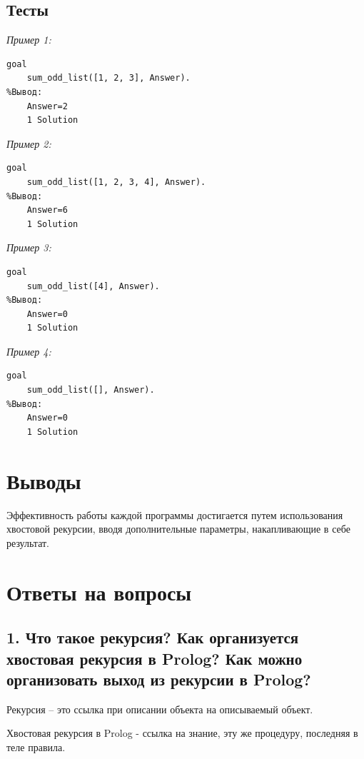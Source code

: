 \documentclass[a4paper,12pt]{article}
\begin{document}
\subsection*{Тесты}

\textit{Пример 1:}

\begin{verbatim}
goal
	sum_odd_list([1, 2, 3], Answer).
%Вывод:
	Answer=2
	1 Solution
\end{verbatim}

\textit{Пример 2:}

\begin{verbatim}
goal
	sum_odd_list([1, 2, 3, 4], Answer).
%Вывод:
	Answer=6
	1 Solution
\end{verbatim}

\textit{Пример 3:}

\begin{verbatim}
goal
	sum_odd_list([4], Answer).
%Вывод:
	Answer=0
	1 Solution
\end{verbatim}

\textit{Пример 4:}

\begin{verbatim}
goal
	sum_odd_list([], Answer).
%Вывод:
	Answer=0
	1 Solution
\end{verbatim}

\section*{Выводы}

Эффективность работы каждой программы достигается путем использования хвостовой рекурсии, вводя дополнительные параметры, накапливающие в себе результат.

\newpage

\section*{Ответы на вопросы}

\subsection*{1.	Что такое рекурсия? Как организуется хвостовая рекурсия в Prolog? Как можно организовать выход из рекурсии в Prolog?}

Рекурсия – это ссылка при описании объекта на описываемый объект.

Хвостовая рекурсия в Prolog - ссылка на знание, эту же процедуру, 
последняя в теле правила.
\end{document}
